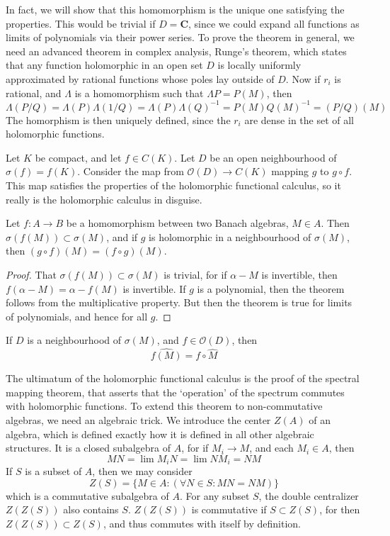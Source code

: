 In fact, we will show that this homomorphism is the unique one satisfying the properties. This would be trivial if $D = \mathbf{C}$, since we could expand all functions as limits of polynomials via their power series. To prove the theorem in general, we need an advanced theorem in complex analysis, Runge's theorem, which states that any function holomorphic in an open set $D$ is locally uniformly approximated by rational functions whose poles lay outside of $D$. Now if $r_i$ is rational, and $\Lambda$ is a homomorphism such that $\Lambda P = P(M)$, then
%
\[ \Lambda (P/Q) = \Lambda(P) \Lambda(1/Q) = \Lambda(P) \Lambda(Q)^{-1} = P(M) Q(M)^{-1} = (P/Q)(M) \]
%
The homorphism is then uniquely defined, since the $r_i$ are dense in the set of all holomorphic functions.

\begin{example}
    Let $K$ be compact, and let $f \in C(K)$. Let $D$ be an open neighbourhood of $\sigma(f) = f(K)$. Consider the map from $\mathcal{O}(D) \to C(K)$ mapping $g$ to $g \circ f$. This map satisfies the properties of the holomorphic functional calculus, so it really is the holomorphic calculus in disguise.
\end{example}

\begin{theorem}
    Let $f:A \to B$ be a homomorphism between two Banach algebras, $M \in A$. Then $\sigma(f(M)) \subset \sigma(M)$, and if $g$ is holomorphic in a neighbourhood of $\sigma(M)$, then $(g \circ f)(M) = (f \circ g)(M)$.
\end{theorem}
\begin{proof}
    That $\sigma(f(M)) \subset \sigma(M)$ is trivial, for if $\alpha - M$ is invertible, then $f(\alpha - M) = \alpha - f(M)$ is invertible. If $g$ is a polynomial, then the theorem follows from the multiplicative property. But then the theorem is true for limits of polynomials, and hence for all $g$.
\end{proof}

\begin{corollary}
    If $D$ is a neighbourhood of $\sigma(M)$, and $f \in \mathcal{O}(D)$, then
    \[ \widehat{f(M)} = f \circ \widehat{M} \]
\end{corollary}

The ultimatum of the holomorphic functional calculus is the proof of the spectral mapping theorem, that asserts that the `operation' of the spectrum commutes with holomorphic functions. To extend this theorem to non-commutative algebras, we need an algebraic trick. We introduce the center $Z(A)$ of an algebra, which is defined exactly how it is defined in all other algebraic structures. It is a closed subalgebra of $A$, for if $M_i \to M$, and each $M_i \in A$, then
%
\[ MN = \lim M_iN = \lim NM_i = NM \]
%
If $S$ is a subset of $A$, then we may consider
%
\[ Z(S) = \{ M \in A : (\forall N \in S: MN = NM) \} \]
%
which is a commutative subalgebra of $A$. For any subset $S$, the double centralizer $Z(Z(S))$ also contains $S$. $Z(Z(S))$ is commutative if $S \subset Z(S)$, for then $Z(Z(S)) \subset Z(S)$, and thus commutes with itself by definition.

